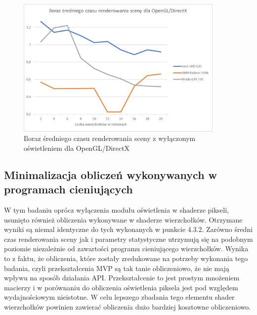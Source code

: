 \documentclass[archive]{mgr}
\begin{document}
\begin{figure}[h!]
  \centering
    \includegraphics[width=0.9\textwidth]{images/fragoff/4.png}
   \caption{Iloraz średniego czasu renderowania sceny z wyłączonym oświetleniem dla OpenGL/DirectX}
   \label{lab:24}
\end{figure}

\subsection{Minimalizacja obliczeń wykonywanych w programach cieniujących}

W tym badaniu oprócz wyłączenia modułu oświetlenia w shaderze pikseli, usunięto również obliczenia wykonywane w shaderze wierzchołków. Otrzymane wyniki są niemal identyczne do tych wykonanych w punkcie 4.3.2. Zarówno średni czas renderowania sceny jak i parametry statystyczne utrzymują się na podobnym poziomie niezależnie od zawartości programu cieniującego wierzchołków. Wynika to z faktu, że obliczenia, które zostały zredukowane na potrzeby wykonania tego badania, czyli przekształcenia MVP są tak tanie obliczeniowo, że nie mają wpływu na sposób działania API. Przekształcenie to jest prostym mnożeniem macierzy i w porównaniu do obliczenia oświetlenia piksela jest pod względem wydajnościowym nieistotne. W celu lepszego zbadania tego elementu shader wierzchołków powinien zawierać obliczenia dużo bardziej kosztowne obliczeniowo.
\end{document}
